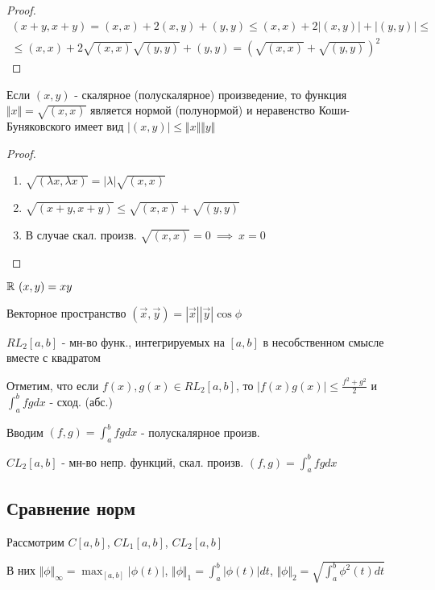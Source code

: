 \documentclass{article}
\begin{document}
\begin{proof}
  \begin{gather*}
    (x+y,x+y)=(x,x)+2(x,y)+(y,y) \le (x,x) + 2|(x,y)|+|(y,y)| \le \\ 
    \le (x,x)+2\sqrt{(x,x)}\sqrt{(y,y)}+(y,y)=(\sqrt{(x,x)}+\sqrt{(y,y)})^{2}
  \end{gather*}
\end{proof}
\begin{lemma}
  Если $(x,y)$ - скалярное (полускалярное) произведение, то
  функция $\Vert x \Vert=\sqrt{(x,x)}$ является нормой (полунормой)
  и неравенство Коши-Буняковского имеет вид $|(x,y)|\le\Vert x \Vert\Vert y \Vert$
\end{lemma}
\begin{proof}
  \phantom{.}

  \begin{enumerate}
    \item $\sqrt{(\lambda x,\lambda x)}=|\lambda|\sqrt{(x,x)}$ 
    \item $\sqrt{(x+y,x+y)}\le \sqrt{(x,x)} + \sqrt{(y,y)}$
    \item В случае скал. произв. $\sqrt{(x,x)}=0 \ \implies \ x=0$
  \end{enumerate}
\end{proof}
\begin{eg}
  $\mathbb{R} \ (x,y)=xy$
\end{eg}
\begin{eg}
  Векторное пространство $(\vec{x},\vec{y})=|\vec{x}||\vec{y}|\cos \phi$
\end{eg}
\begin{eg}
  $RL_2[a,b]$ - мн-во функ., интегрируемых на $[a,b]$ в несобственном смысле вместе с квадратом

  Отметим, что если $f(x), g(x) \in RL_2[a,b]$, то $|f(x)g(x)|\le \frac{f^{2}+g^{2}}{2}$ и 
  $\int_{a}^{b}fgdx$ - сход. (абс.)

  Вводим $(f,g)=\int_{a}^{b}fgdx$ - полускалярное произв.
\end{eg}
\begin{eg}
  $CL_2[a,b]$ - мн-во непр. функций, скал. произв. $(f,g)=\int_{a}^{b}fgdx$
\end{eg}

\subsection{Сравнение норм}
Рассмотрим $C[a,b]$, $CL_1[a,b]$, $CL_2[a,b]$

В них $\Vert \phi \Vert_{\infty}=\max_{[a,b]}|\phi(t)|$, $\Vert \phi \Vert_{1}=\int_{a}^{b}|\phi(t)|dt$,
$\Vert \phi \Vert_{2}=\sqrt{\int_{a}^{b}\phi^{2}(t)dt}$
\end{document}
